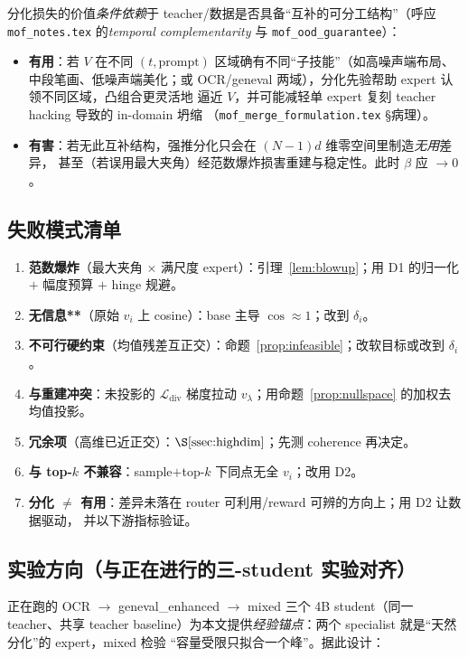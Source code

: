\documentclass[11pt,a4paper]{article}
\newcommand{\loss}{\mathcal{L}}
\theoremstyle{definition}
\begin{document}
分化损失的价值\emph{条件依赖}于 teacher/数据是否具备``互补的可分工结构''（呼应
\texttt{mof\_notes.tex} 的\emph{temporal complementarity} 与 \texttt{mof\_ood\_guarantee}）：
\begin{itemize}[leftmargin=1.5em]
\item \textbf{有用}：若 $V$ 在不同 $(t,\text{prompt})$ 区域确有不同``子技能''（如高噪声端布局、
中段笔画、低噪声端美化；或 OCR/geneval 两域），分化先验帮助 expert 认领不同区域，凸组合更灵活地
逼近 $V$，并可能减轻单 expert 复刻 teacher hacking 导致的 in-domain 坍缩
（\texttt{mof\_merge\_formulation.tex} §病理）。
\item \textbf{有害}：若无此互补结构，强推分化只会在 $(N-1)d$ 维零空间里制造\emph{无用}差异，
甚至（若误用最大夹角）经范数爆炸损害重建与稳定性。此时 $\beta$ 应 $\to0$。
\end{itemize}

\subsection{失败模式清单}
\label{ssec:failure}
\begin{enumerate}[leftmargin=1.5em]
\item \textbf{范数爆炸}（最大夹角 $\times$ 满尺度 expert）：引理~\ref{lem:blowup}；用 D1 的归一化
$+$ 幅度预算 $+$ hinge 规避。
\item \textbf{无信息**}（原始 $v_i$ 上 cosine）：base 主导 $\cos\approx1$；改到 $\delta_i$。
\item \textbf{不可行硬约束}（均值残差互正交）：命题~\ref{prop:infeasible}；改软目标或改到 $\delta_i$。
\item \textbf{与重建冲突}：未投影的 $\loss_{\mathrm{div}}$ 梯度拉动 $v_\lambda$；用命题~\ref{prop:nullspace}
的加权去均值投影。
\item \textbf{冗余项}（高维已近正交）：$\S\ref{ssec:highdim}$；先测 coherence 再决定。
\item \textbf{与 top-$k$ 不兼容}：sample$+$top-$k$ 下同点无全 $v_i$；改用 D2。
\item \textbf{分化 $\neq$ 有用}：差异未落在 router 可利用/reward 可辨的方向上；用 D2 让数据驱动，
并以下游指标验证。
\end{enumerate}

\subsection{实验方向（与正在进行的三-student 实验对齐）}
\label{ssec:exp}

正在跑的 OCR $\to$ geneval\_enhanced $\to$ mixed 三个 4B student（同一 teacher、共享 teacher
baseline）为本文提供\emph{经验锚点}：两个 specialist 就是``天然分化''的 expert，mixed 检验
``容量受限只拟合一个峰''。据此设计：
\end{document}
